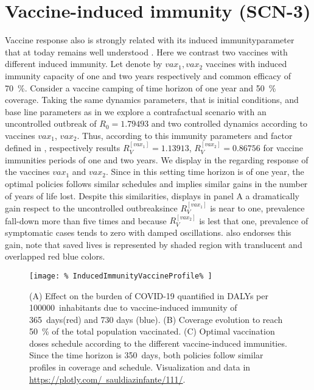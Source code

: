 \section*{Vaccine-induced immunity (SCN-3)}
    Vaccine response also is strongly related with its induced
    immunity\textemdash parameter that at today remains well understood
    \cite{Jeyanathan2020}.
    Here we contrast two vaccines with different induced immunity. Let
    denote by $vax_1, vax_2$ vaccines with induced immunity capacity of one and
    two years respectively and common efficacy of \SI{70}{\percent}. Consider a
    vaccine camping of time horizon of one year and \SI{50}{\percent} coverage.
    Taking the same dynamics parameters, that is initial conditions, and base
    line parameters as in   we explore a
    contrafactual scenario with an uncontrolled outbreak of
    $R_0 = \num{1.79493}$ and two controlled dynamics according to vaccines
    $vax_1$, $vax_2$. Thus, according to this immunity parameters and factor
    defined in , respectively results
    $R_V^{[vax_1]} = \num{1.13913}$, $R_V^{[vax_2]} = \num{0.86756}$
    for vaccine immunities periods of one and two years. We display in
     the regarding response of the
    vaccines $vax_1$ and $vax_2$. Since in this setting time
    horizon is of one year, the optimal policies follows similar schedules and
    implies similar gains in the number of years of life lost. Despite this
    similarities, 
    displays in panel A a dramatically gain respect to the
    uncontrolled outbreak\textemdash since
    $R_V ^{[vax_1]}$ is near to one, prevalence fall-down more than five times
    and because $R_V ^{[vax_2]}$ is lest that one, prevalence of symptomatic
    cases tends to zero with damped oscillations.
     also endorses this gain,
    note that saved lives is represented by  shaded region with translucent
    and overlapped red blue colors.
%
    \begin{figure*}[htb]
        \centering
        \texttt{[image: \%
        InducedImmunityVaccineProfile\%
        ]}
        \caption[
            Effect of Vaccine-induced immunity effect on the burden of COVID-19.
        ]{
            (A) Effect on the burden of COVID-19 quantified in DALYs per
            \SI{100000}{inhabitants} due to vaccine-induced immunity of
            \SI{365}{days}(red) and 730 days (blue).
            (B) Coverage evolution to reach \SI{50}{\percent} of the total
            population vaccinated.
            (C) Optimal vaccination doses schedule according to the different
            vaccine-induced immunities. Since the time horizon is
            \SI{350}{days}, both policies follow similar profiles in coverage
            and schedule. Visualization and data in
            \href{https://plotly.com/~sauldiazinfante/111/}{%
                https://plotly.com/~sauldiazinfante/111/}.
        }
        \label{fig:induced_immunity_vaccine_profile}
    \end{figure*}
